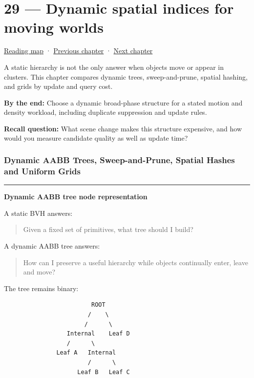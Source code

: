 \hypertarget{06-engine-ii-ch029}{}
\chapter{29 --- Dynamic spatial indices for moving worlds}\label{06-engine-ii-ch029-dynamic-spatial-indices-for-moving-worlds}

\hyperref[volume-reading-map]{Reading map} · \hyperref[06-engine-ii-ch028]{Previous chapter} · \hyperref[06-engine-ii-ch030]{Next chapter}

A static hierarchy is not the only answer when objects move or appear in clusters. This chapter compares dynamic trees, sweep-and-prune, spatial hashing, and grids by update and query cost.

\textbf{By the end:} Choose a dynamic broad-phase structure for a stated motion and density workload, including duplicate suppression and update rules.

\textbf{Recall question:} What scene change makes this structure expensive, and how would you measure candidate quality as well as update time?

\subsection{Dynamic AABB Trees, Sweep-and-Prune, Spatial Hashes and Uniform Grids}\label{06-engine-ii-ch029-dynamic-aabb-trees-sweep-and-prune-spatial-hashes-and-uniform-grids}

\begin{center}\rule{0.5\linewidth}{0.5pt}\end{center}

\textbf{Dynamic AABB tree node representation}

A static BVH answers:

\begin{quote}
Given a fixed set of primitives, what tree should I build?
\end{quote}

A dynamic AABB tree answers:

\begin{quote}
How can I preserve a useful hierarchy while objects continually enter, leave and move?
\end{quote}

The tree remains binary:

\begin{verbatim}
                         ROOT
                        /    \
                       /      \
                  Internal    Leaf D
                  /      \
               Leaf A   Internal
                        /      \
                     Leaf B   Leaf C
\end{verbatim}

